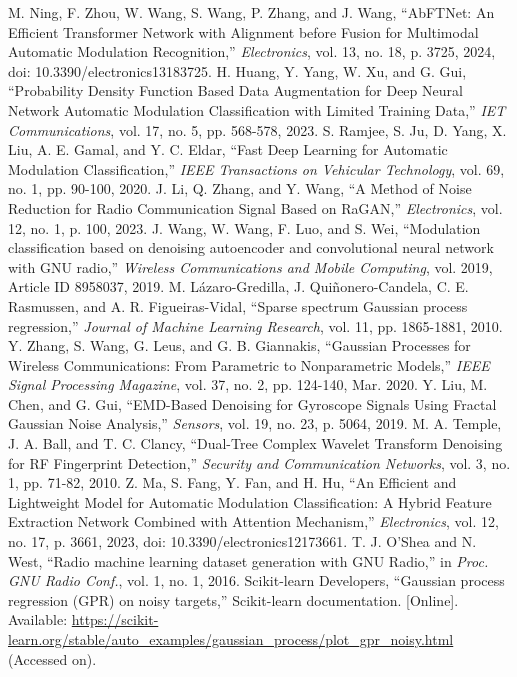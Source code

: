\documentclass[conference]{IEEEtran}
\begin{document}
\begin{thebibliography}{00}
 M. Ning, F. Zhou, W. Wang, S. Wang, P. Zhang, and J. Wang, ``AbFTNet: An Efficient Transformer Network with Alignment before Fusion for Multimodal Automatic Modulation Recognition,'' \textit{Electronics}, vol. 13, no. 18, p. 3725, 2024, doi: 10.3390/electronics13183725. %
\bibitem{[19]} H. Huang, Y. Yang, W. Xu, and G. Gui, ``Probability Density Function Based Data Augmentation for Deep Neural Network Automatic Modulation Classification with Limited Training Data,'' \textit{IET Communications}, vol. 17, no. 5, pp. 568-578, 2023.
\bibitem{[13]} S. Ramjee, S. Ju, D. Yang, X. Liu, A. E. Gamal, and Y. C. Eldar, ``Fast Deep Learning for Automatic Modulation Classification,'' \textit{IEEE Transactions on Vehicular Technology}, vol. 69, no. 1, pp. 90-100, 2020.
\bibitem{[15]} J. Li, Q. Zhang, and Y. Wang, ``A Method of Noise Reduction for Radio Communication Signal Based on RaGAN,'' \textit{Electronics}, vol. 12, no. 1, p. 100, 2023.
\bibitem{[20]} J. Wang, W. Wang, F. Luo, and S. Wei, ``Modulation classification based on denoising autoencoder and convolutional neural network with GNU radio,'' \textit{Wireless Communications and Mobile Computing}, vol. 2019, Article ID 8958037, 2019.
\bibitem{[17]} M. Lázaro-Gredilla, J. Quiñonero-Candela, C. E. Rasmussen, and A. R. Figueiras-Vidal, ``Sparse spectrum Gaussian process regression,'' \textit{Journal of Machine Learning Research}, vol. 11, pp. 1865-1881, 2010.
\bibitem{[18]} Y. Zhang, S. Wang, G. Leus, and G. B. Giannakis, ``Gaussian Processes for Wireless Communications: From Parametric to Nonparametric Models,'' \textit{IEEE Signal Processing Magazine}, vol. 37, no. 2, pp. 124-140, Mar. 2020.
\bibitem{[55]} Y. Liu, M. Chen, and G. Gui, ``EMD-Based Denoising for Gyroscope Signals Using Fractal Gaussian Noise Analysis,'' \textit{Sensors}, vol. 19, no. 23, p. 5064, 2019.
\bibitem{[56]} M. A. Temple, J. A. Ball, and T. C. Clancy, ``Dual-Tree Complex Wavelet Transform Denoising for RF Fingerprint Detection,'' \textit{Security and Communication Networks}, vol. 3, no. 1, pp. 71-82, 2010.
 Z. Ma, S. Fang, Y. Fan, and H. Hu, ``An Efficient and Lightweight Model for Automatic Modulation Classification: A Hybrid Feature Extraction Network Combined with Attention Mechanism,'' \textit{Electronics}, vol. 12, no. 17, p. 3661, 2023, doi: 10.3390/electronics12173661.
 T. J. O'Shea and N. West, ``Radio machine learning dataset generation with GNU Radio,'' in \textit{Proc. GNU Radio Conf.}, vol. 1, no. 1, 2016. %
\bibitem{[63]} Scikit-learn Developers, ``Gaussian process regression (GPR) on noisy targets,'' Scikit-learn documentation. [Online]. Available: \url{https://scikit-learn.org/stable/auto_examples/gaussian_process/plot_gpr_noisy.html} (Accessed on).

\end{thebibliography}
\end{document}

